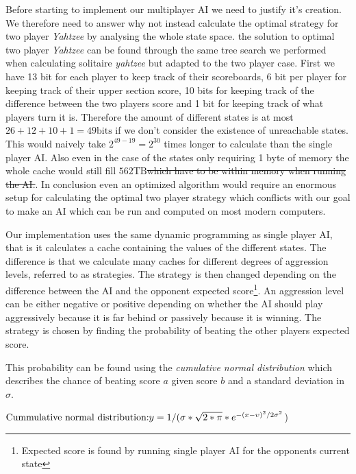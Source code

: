 Before starting to implement our multiplayer AI we need to justify it's creation. We therefore need to answer why not instead calculate the optimal strategy for two player \emph{Yahtzee} by analysing the whole state space. the solution to optimal two player \emph{Yahtzee} can be found through the same tree search we performed when calculating solitaire \emph{yahtzee} but adapted to the two player case. First we have 13 bit for each player to keep track of their scoreboards, 6 bit per player for keeping track of their upper section score, 10 bits for keeping track of the difference between the two players score and 1 bit for keeping track of what players turn it is. Therefore the amount of different states is at most $26+12+10+1 = 49\mbox{bits}$ if we don't consider the existence of unreachable states. This would naively take $2^{49-19} = 2^{30}$ times longer to calculate than the single player AI. Also even in the case of the states only requiring 1 byte of memory the whole cache would still fill $562 \mbox{TB}$\st{which have to be within memory when running the AI.}. In conclusion even an optimized algorithm would require an enormous setup for calculating the optimal two player strategy which conflicts with our goal to make an AI which can be run and computed on most modern computers. 

Our implementation uses the same dynamic programming as single player AI, that is it calculates a cache containing the values of the different states. The difference is that we calculate many caches for different degrees of aggression levels, referred to as strategies. The strategy is then changed depending on the difference between the AI and the opponent expected score\footnote{Expected score is found by running single player AI for the opponents current state}. An aggression level can be either negative or positive depending on whether the AI should play aggressively because it is far behind or passively because it is winning. The strategy is chosen by finding the probability of beating the other players expected score. 

This probability can be found using the \emph{cumulative normal distribution} which describes the chance of beating score $a$ given score $b$ and a standard deviation in  $\sigma$. %

$\newline\mbox{Cummulative normal distribution:} \newline y = 1  /(\sigma * \sqrt{2 * \pi} * e^{-(x - \upsilon)^2 / 2 \sigma^2}$)\newline

